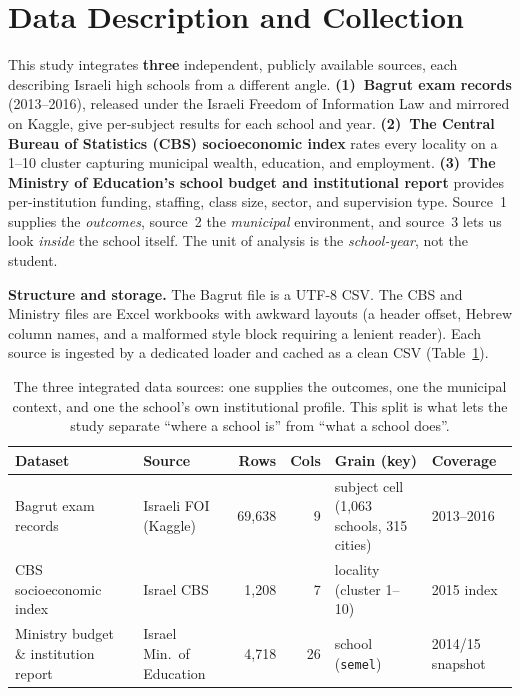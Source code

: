 \section{Data Description and Collection}

This study integrates \textbf{three} independent, publicly available sources,
each describing Israeli high schools from a different angle. \textbf{(1)~Bagrut
exam records} (2013--2016), released under the Israeli Freedom of Information Law
and mirrored on Kaggle, give per-subject results for each school and year.
\textbf{(2)~The Central Bureau of Statistics (CBS) socioeconomic index}
rates every locality on a 1--10 cluster capturing municipal wealth, education,
and employment. \textbf{(3)~The Ministry of Education's school budget and
institutional report} provides per-institution funding, staffing, class size,
sector, and supervision type. Source~1 supplies the \emph{outcomes}, source~2 the
\emph{municipal} environment, and source~3 lets us look \emph{inside} the school
itself. The unit of analysis is the \emph{school-year}, not the student.

\textbf{Structure and storage.} The Bagrut file is a UTF-8 CSV. The CBS and
Ministry files are Excel workbooks with awkward layouts (a header offset, Hebrew
column names, and a malformed style block requiring a lenient reader). Each
source is ingested by a dedicated loader and cached as a clean CSV
(Table~\ref{tab:datasets}).

\begin{table}[ht]
\centering
\small
\renewcommand{\arraystretch}{1.35}
\caption{The three integrated data sources: one supplies the outcomes, one the
municipal context, and one the school's own institutional profile. This split is
what lets the study separate ``where a school is'' from ``what a school does''.}
\label{tab:datasets}
\begin{tabular}{@{}>{\raggedright\arraybackslash}p{2.9cm}>{\raggedright\arraybackslash}p{2.5cm}rr>{\raggedright\arraybackslash}p{2.9cm}l@{}}
\toprule
\textbf{Dataset} & \textbf{Source} & \textbf{Rows} & \textbf{Cols} & \textbf{Grain (key)} & \textbf{Coverage} \\
\midrule
Bagrut exam records & Israeli FOI (Kaggle) & 69,638 & 9 & subject cell (1,063 schools, 315 cities) & 2013--2016 \\
CBS socioeconomic index & Israel CBS & 1,208 & 7 & locality (cluster 1--10) & 2015 index \\
Ministry budget \& institution report & Israel Min.\ of Education & 4,718 & 26 & school (\texttt{semel}) & 2014/15 snapshot \\
\bottomrule
\end{tabular}
\end{table}

